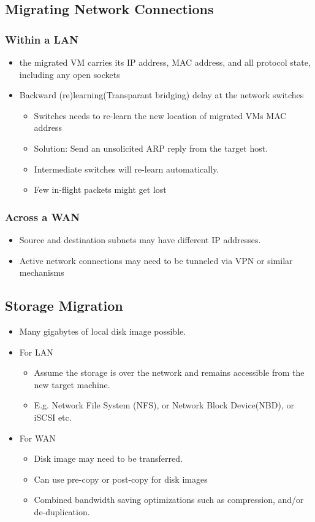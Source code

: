 \documentclass[12pt]{article}
\begin{document}
\subsection{Migrating Network Connections}
\subsubsection{Within a LAN}
\begin{itemize}
    \item the migrated VM carries its IP address, MAC address, and all protocol state, including any open sockets
    \item Backward (re)learning(Transparant bridging) delay at the network switches \begin{itemize}
        \item Switches needs to re-learn the new location of migrated VMs MAC address
        \item Solution: Send an unsolicited ARP reply from the target host.
        \item Intermediate switches will re-learn automatically.
        \item Few in-flight packets might get lost
    \end{itemize}
\end{itemize}
\subsubsection{Across a WAN}
\begin{itemize}
    \item Source and destination subnets may have different IP addresses.
    \item Active network connections may need to be tunneled via VPN or similar mechanisms
\end{itemize}
\subsection{Storage Migration}
\begin{itemize}
    \item Many gigabytes of local disk image possible.
    \item For LAN \begin{itemize}
        \item Assume the storage is over the network and remains accessible from the new target machine.
        \item E.g. Network File System (NFS), or Network Block Device(NBD), or iSCSI etc.
    \end{itemize}
    \item For WAN \begin{itemize}
        \item Disk image may need to be transferred.
        \item Can use pre-copy or post-copy for disk images
        \item Combined bandwidth saving optimizations such as compression, and/or de-duplication.
    \end{itemize}
\end{itemize}
\end{document}
